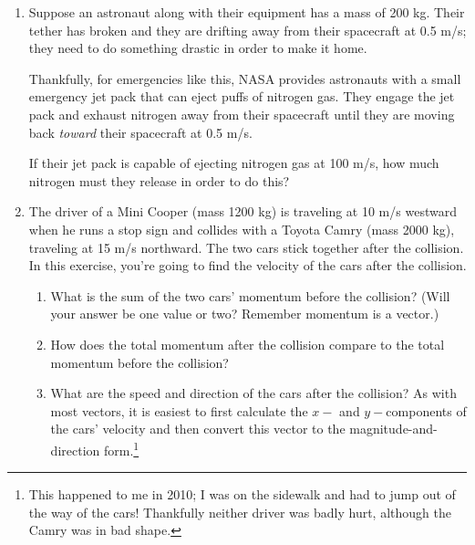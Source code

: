 \documentclass[12pt]{article}
\begin{document}
\newpage

\begin{enumerate}
	
	\item Suppose an astronaut along with their equipment has a mass of 200 kg. Their tether has broken and they are drifting away from their spacecraft at 0.5 m/s; they need to do something drastic in order to make it home.
	
	Thankfully, for emergencies like this, NASA provides astronauts with a small emergency jet pack that can eject puffs of nitrogen gas. They engage the jet pack and exhaust nitrogen away from their spacecraft until they are moving back {\it toward} their spacecraft at 0.5 m/s.
	
	If their jet pack is capable of ejecting nitrogen gas at 100 m/s, how much nitrogen must they release in order to do this?
	

		\newpage
		
		\item{The driver of a Mini Cooper (mass 1200 kg) is traveling at 10 m/s westward when he runs a stop sign and collides with a Toyota Camry (mass 2000 kg), traveling at 15 m/s northward. The two cars stick together after the collision. In this exercise, you're going to find the velocity of the cars after the collision.}
		
		\vspace{2in}
		
		
		\begin{enumerate}
			\item What is the sum of the two cars' momentum before the collision? (Will your answer be one value or two? Remember momentum is a vector.)
			
			\vspace{2.5in}
			
			\item How does the total momentum after the collision compare to the total momentum before the collision?
			
			\newpage
			
			\vspace{2.5in}
			\item{What are the speed and direction of the cars after the collision? As with most vectors, it is easiest to first calculate the $x-$ and $y-$components of the cars' velocity and then convert this vector to the magnitude-and-direction form.\footnote{This happened to me in 2010; I was on the sidewalk and had to jump out of the way of the cars! Thankfully neither driver was badly hurt, although the Camry was in bad shape.}}
			

\end{enumerate}
\end{enumerate}
\end{document}
